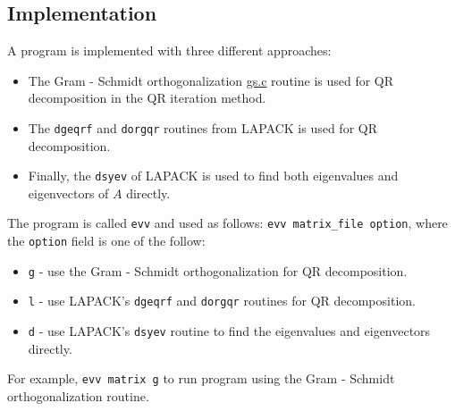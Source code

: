 \documentclass{article}
\begin{document}
\subsection{Implementation}	
A program is implemented with three different approaches:
\begin{itemize}
  \item The Gram - Schmidt
orthogonalization \href{http://www.stat.berkeley.edu/classes/s244/samples/gs.c}{gs.c} routine is
used for QR decomposition in the QR iteration method. 
\item The \texttt{dgeqrf} and \texttt{dorgqr} routines from LAPACK is used for
QR decomposition.
\item Finally, the \texttt{dsyev} of LAPACK is used to find both eigenvalues
and eigenvectors of $A$ directly.
\end{itemize}

The program is called \texttt{evv} and used as follows: \texttt{evv
matrix\_file option}, where the \texttt{option} field is one of the follow:
\begin{itemize}
  \item \texttt{g} - use the Gram - Schmidt orthogonalization for QR
  decomposition.
  \item \texttt{l} - use LAPACK's \texttt{dgeqrf} and \texttt{dorgqr} routines
  for QR decomposition.
  \item \texttt{d} - use LAPACK's \texttt{dsyev} routine to find the
  eigenvalues and eigenvectors directly.
\end{itemize}
For example, \texttt{evv matrix g} to run program using the Gram - Schmidt
orthogonalization routine.
\end{document}

